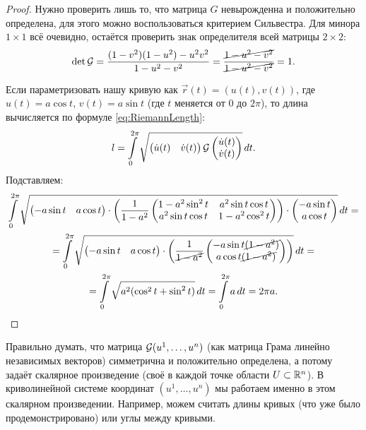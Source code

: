 \begin{proof}
	Нужно проверить лишь то, что матрица $G$ невырожденна и положительно определена, для этого можно воспользоваться критерием Сильвестра. Для минора $1 \times 1$ всё очевидно, остаётся проверить знак определителя всей матрицы $2 \times 2$:
	\[
		\det\mathcal{G} = \frac{(1 - v^2)(1 - u^2) - u^2v^2}{1 - u^2 - v^2} = \frac{\cancel{1 - u^2 - v^2}}{\cancel{1 - u^2 - v^2}} = 1.
	\]
	
	Если параметризовать нашу кривую как $\vec{r}(t) = (u(t), v(t))$, где $u(t) = a\cos t$, $v(t) = a\sin t$ (где $t$ меняется от $0$ до $2\pi$), то длина вычисляется по формуле \eqref{eq:RiemannLength}:
	\[
		l = \int\limits_0^{2\pi}\sqrt{\begin{pmatrix}\dot{u}(t) & \dot{v}(t)\end{pmatrix} \mathcal{G} \begin{pmatrix}\dot{u}(t) \\ \dot{v}(t) \end{pmatrix}}\,dt.
	\]
	Подставляем:
	\begin{multline*}
		\int\limits_0^{2\pi}\sqrt{\begin{pmatrix}-a\sin t & a\cos t\end{pmatrix} \cdot \left(\frac{1}{1 - a^2}\begin{pmatrix} 1 - a^2\sin^2t & a^2\sin t\cos t \\ a^2\sin t\cos t & 1 - a^2\cos^2t \end{pmatrix}\right) \cdot \begin{pmatrix} -a\sin t \\ a\cos t \end{pmatrix}}\,dt =\\ = \int\limits_0^{2\pi}\sqrt{\begin{pmatrix} -a\sin t & a\cos t \end{pmatrix} \cdot \left(\frac{1}{\cancel{1 - a^2}}\begin{pmatrix} -a\sin t\cancel{(1 - a^2)} \\ a\cos t\cancel{(1 - a^2)}\end{pmatrix}\right)}\,dt =\\ = \int\limits_0^{2\pi}\sqrt{a^2(\cos^2t + \sin^2t)}\,dt = \int\limits_0^{2\pi}a\,dt = 2\pi a.
	\end{multline*}
\end{proof}

Правильно думать, что матрица $\mathcal{G}(u^1, \ldots, u^n)$ (как матрица Грама линейно независимых векторов) симметрична и положительно определена, а потому задаёт скалярное произведение (своё в каждой точке области $U \subset \mathbb{R}^n$). В криволинейной системе координат $(u^1, \ldots, u^n)$ мы работаем именно в этом скалярном произведении. Например, можем считать длины кривых (что уже было продемонстрировано) или углы между кривыми.

